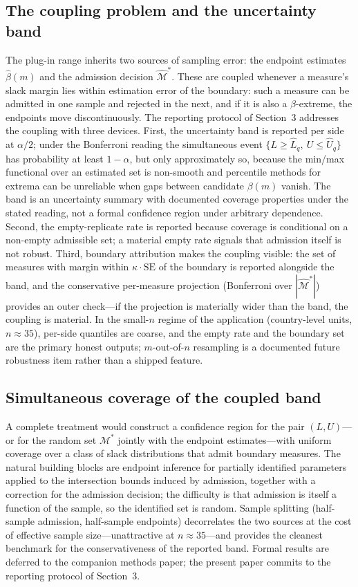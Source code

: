 \documentclass[10pt,letterpaper]{article}
\newcommand{\M}{\ensuremath{\mathcal{M}}}
\begin{document}
\subsection{The coupling problem and the uncertainty band}
The plug-in range inherits two sources of sampling error: the endpoint estimates $\hat{\beta}(m)$ and the admission decision $\hat{\M}^*$. These are coupled whenever a measure's slack margin lies within estimation error of the boundary: such a measure can be admitted in one sample and rejected in the next, and if it is also a $\beta$-extreme, the endpoints move discontinuously. The reporting protocol of Section~3 addresses the coupling with three devices. First, the uncertainty band is reported per side at $\alpha/2$; under the Bonferroni reading the simultaneous event $\{L\ge \hat L_q,\ U\le \hat U_q\}$ has probability at least $1-\alpha$, but only approximately so, because the min/max functional over an estimated set is non-smooth and percentile methods for extrema can be unreliable when gaps between candidate $\beta(m)$ vanish. The band is an uncertainty summary with documented coverage properties under the stated reading, not a formal confidence region under arbitrary dependence. Second, the empty-replicate rate is reported because coverage is conditional on a non-empty admissible set; a material empty rate signals that admission itself is not robust. Third, boundary attribution makes the coupling visible: the set of measures with margin within $\kappa\cdot\mathrm{SE}$ of the boundary is reported alongside the band, and the conservative per-measure projection (Bonferroni over $|\hat{\M}^*|$) provides an outer check---if the projection is materially wider than the band, the coupling is material. In the small-$n$ regime of the application (country-level units, $n\approx 35$), per-side quantiles are coarse, and the empty rate and the boundary set are the primary honest outputs; $m$-out-of-$n$ resampling is a documented future robustness item rather than a shipped feature.

\subsection{Simultaneous coverage of the coupled band}
A complete treatment would construct a confidence region for the pair $(L,U)$---or for the random set $\M^*$ jointly with the endpoint estimates---with uniform coverage over a class of slack distributions that admit boundary measures. The natural building blocks are endpoint inference for partially identified parameters \cite{imbensmanski2004,stoye2009} applied to the intersection bounds induced by admission, together with a correction for the admission decision; the difficulty is that admission is itself a function of the sample, so the identified set is random. Sample splitting (half-sample admission, half-sample endpoints) decorrelates the two sources at the cost of effective sample size---unattractive at $n\approx 35$---and provides the cleanest benchmark for the conservativeness of the reported band. Formal results are deferred to the companion methods paper; the present paper commits to the reporting protocol of Section~3.
\end{document}
